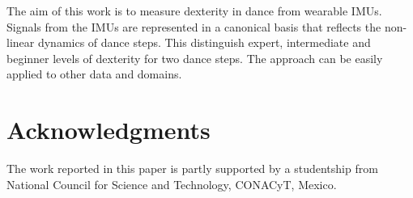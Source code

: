 \documentclass{sigchi}
\begin{document}
The aim of this work is to measure dexterity in dance from wearable IMUs. Signals from the IMUs are represented
in a canonical basis that reflects the non-linear dynamics of dance steps. 
This distinguish expert, intermediate and beginner levels of dexterity for two dance steps.
The approach can be easily applied to other data and domains. 



\section{Acknowledgments}
The work reported in this paper is partly supported by a studentship from
National Council for Science and Technology, CONACyT, Mexico.



%
%
%
%
%
\balance





\end{document}
